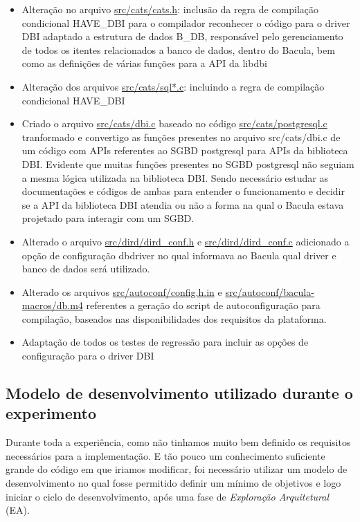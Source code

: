 \begin{itemize}
\item Alteração no arquivo \url{src/cats/cats.h}: 
 \subitem inclusão da regra de compilação condicional HAVE\_DBI para o compilador reconhecer o código para o driver DBI
 \subitem adaptado a estrutura de dados B\_DB, responsável pelo gerenciamento de todos os itentes relacionados a banco de dados, dentro do Bacula, bem como as definições de várias funções para a API da libdbi
\item Alteração dos arquivos \url{src/cats/sql*.c}: incluindo a regra de compilação condicional HAVE\_DBI
\item Criado o arquivo \url{src/cats/dbi.c} baseado no código \url{src/cats/postgresql.c}
 \subitem tranformado e convertigo as funções presentes no arquivo src/cats/dbi.c de um código com APIs referentes ao SGBD postgresql para APIs da  biblioteca DBI. Evidente que muitas funções presentes no SGBD postgresql não seguiam a mesma lógica utilizada na biblioteca DBI. Sendo necessário estudar as documentações e códigos de ambas para entender o funcionamento e decidir se a API da biblioteca DBI atendia ou não a forma na qual o Bacula estava projetado para interagir com um SGBD. 
\item Alterado o arquivo \url{src/dird/dird_conf.h} e \url{src/dird/dird_conf.c}
 \subitem adicionado a opção de configuração dbdriver no qual informava ao Bacula qual driver e banco de dados será utilizado.
\item Alterado os arquivos \url{src/autoconf/config.h.in} e \url{src/autoconf/bacula-macros/db.m4} referentes a geração do script de autoconfiguração para compilação, baseados nas disponibilidades dos requisitos da plataforma.
\item Adaptação de todos os testes de regressão para incluir as opções de configuração para o driver DBI
\end{itemize}

\subsection{Modelo de desenvolvimento utilizado durante o experimento} 

Durante toda a experiência, como não tinhamos muito bem definido os requisitos necessários para a implementação. E tão pouco um conhecimento suficiente grande do código em que iriamos modificar, foi necessário utilizar um modelo de desenvolvimento no qual fosse permitido definir um mínimo de objetivos e logo iniciar o ciclo de desenvolvimento, após uma fase de \textit{Exploração Arquitetural} (EA). 

